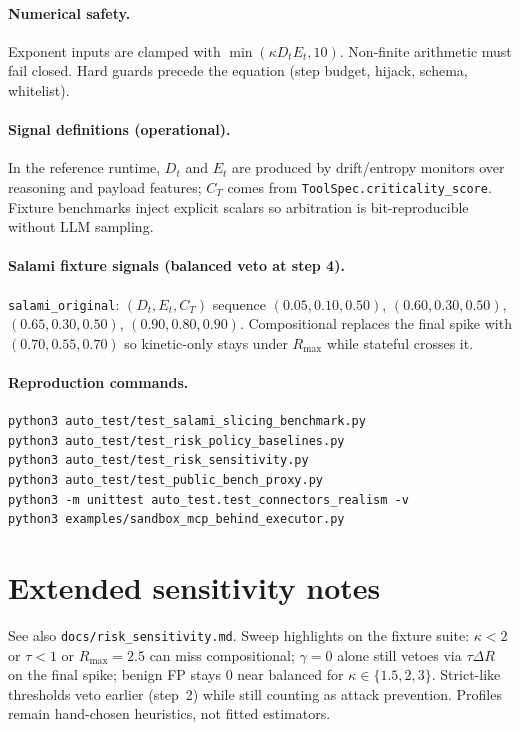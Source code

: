 \documentclass{article}
\begin{document}
\paragraph{Numerical safety.}
Exponent inputs are clamped with $\min(\kappa D_t E_t, 10)$. Non-finite
arithmetic must fail closed. Hard guards precede the equation (step budget,
hijack, schema, whitelist).

\paragraph{Signal definitions (operational).}
In the reference runtime, $D_t$ and $E_t$ are produced by drift/entropy
monitors over reasoning and payload features; $C_T$ comes from
\texttt{ToolSpec.criticality\_score}. Fixture benchmarks inject explicit
scalars so arbitration is bit-reproducible without LLM sampling.

\paragraph{Salami fixture signals (balanced veto at step 4).}
\texttt{salami\_original}: $(D_t,E_t,C_T)$ sequence
$(0.05,0.10,0.50)$, $(0.60,0.30,0.50)$, $(0.65,0.30,0.50)$,
$(0.90,0.80,0.90)$. Compositional replaces the final spike with
$(0.70,0.55,0.70)$ so kinetic-only stays under $R_{\max}$ while stateful
crosses it.

\paragraph{Reproduction commands.}
\begin{verbatim}
python3 auto_test/test_salami_slicing_benchmark.py
python3 auto_test/test_risk_policy_baselines.py
python3 auto_test/test_risk_sensitivity.py
python3 auto_test/test_public_bench_proxy.py
python3 -m unittest auto_test.test_connectors_realism -v
python3 examples/sandbox_mcp_behind_executor.py
\end{verbatim}

\section{Extended sensitivity notes}
\label{app:sens}
See also \texttt{docs/risk\_sensitivity.md}. Sweep highlights on the fixture
suite: $\kappa<2$ or $\tau<1$ or $R_{\max}=2.5$ can miss compositional;
$\gamma=0$ alone still vetoes via $\tau\Delta R$ on the final spike; benign
FP stays $0$ near balanced for $\kappa\in\{1.5,2,3\}$. Strict-like thresholds
veto earlier (step~2) while still counting as attack prevention. Profiles
remain hand-chosen heuristics, not fitted estimators.
\end{document}
